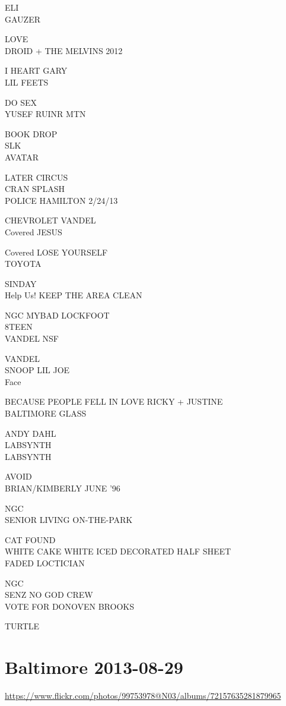 \documentclass[10pt,letterpaper]{article}
\begin{document}
ELI\\
GAUZER

LOVE\\
DROID + THE MELVINS 2012

I HEART GARY\\
LIL FEETS

DO SEX\\
YUSEF RUINR MTN

BOOK DROP\\
SLK\\
AVATAR

LATER CIRCUS\\
CRAN SPLASH\\
POLICE HAMILTON 2/24/13

CHEVROLET VANDEL\\
Covered JESUS

Covered LOSE YOURSELF\\
TOYOTA

SINDAY\\
Help Us! KEEP THE AREA CLEAN

NGC MYBAD LOCKFOOT\\
8TEEN\\
VANDEL NSF

VANDEL\\
SNOOP LIL JOE\\
Face

BECAUSE PEOPLE FELL IN LOVE RICKY + JUSTINE\\
BALTIMORE GLASS

ANDY DAHL\\
LABSYNTH\\
LABSYNTH

AVOID\\
BRIAN/KIMBERLY JUNE '96

NGC\\
SENIOR LIVING ON{-}THE{-}PARK

CAT FOUND\\
WHITE CAKE WHITE ICED DECORATED HALF SHEET\\
FADED LOCTICIAN

NGC\\
SENZ NO GOD CREW\\
VOTE FOR DONOVEN BROOKS

TURTLE
\pagebreak

\section*{Baltimore 2013-08-29}

\url{https://www.flickr.com/photos/99753978@N03/albums/72157635281879965}
\end{document}
